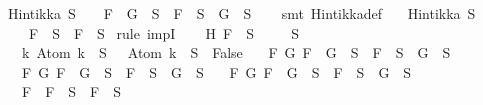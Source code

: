 \begin{isabellebody}
\ {\isachardoublequoteopen}Hintikka\ S\ {\isasymLongrightarrow}\ \ \ {\isacharparenleft}F\ \isactrlbold {\isasymrightarrow}\ G\ {\isasymin}\ S\ {\isasymlongrightarrow}\ \isactrlbold {\isasymnot}F\ {\isasymin}\ S\ {\isasymor}\ G\ {\isasymin}\ S{\isacharparenright}{\isachardoublequoteclose}\isanewline
%
\isadelimproof
\ \ %
\endisadelimproof
%
\isatagproof
{}\isamarkupfalse%
\ {\isacharparenleft}smt\ Hintikka{\isacharunderscore}def{\isacharparenright}%
\endisatagproof
{\isafoldproof}%
%
\isadelimproof
\isanewline
%
\endisadelimproof
\isanewline
{}\isamarkupfalse%
\isanewline
\ \ \ {\isachardoublequoteopen}Hintikka\ S{\isachardoublequoteclose}\isanewline
\ \ \ {\isachardoublequoteopen}{\isacharparenleft}\isactrlbold {\isasymnot}\ {\isacharparenleft}\isactrlbold {\isasymnot}F{\isacharparenright}\ {\isasymin}\ S\ {\isasymlongrightarrow}\ F\ {\isasymin}\ S{\isacharparenright}{\isachardoublequoteclose}\isanewline
%
\isadelimproof
%
\endisadelimproof
%
\isatagproof
{}\isamarkupfalse%
\ {\isacharparenleft}rule\ impI{\isacharparenright}\isanewline
\ \ \isamarkupfalse%
\ H{\isacharcolon}{\isachardoublequoteopen}\isactrlbold {\isasymnot}\ {\isacharparenleft}\isactrlbold {\isasymnot}F{\isacharparenright}\ {\isasymin}\ S{\isachardoublequoteclose}\isanewline
\ \isamarkupfalse%
\ {\isachardoublequoteopen}{\isasymbottom}\ {\isasymnotin}\ S\isanewline
\ \ {\isasymand}\ {\isacharparenleft}{\isasymforall}k{\isachardot}\ Atom\ k\ {\isasymin}\ S\ {\isasymlongrightarrow}\ \isactrlbold {\isasymnot}\ {\isacharparenleft}Atom\ k{\isacharparenright}\ {\isasymin}\ S\ {\isasymlongrightarrow}\ False{\isacharparenright}\isanewline
\ \ {\isasymand}\ {\isacharparenleft}{\isasymforall}F\ G{\isachardot}\ F\ \isactrlbold {\isasymand}\ G\ {\isasymin}\ S\ {\isasymlongrightarrow}\ F\ {\isasymin}\ S\ {\isasymand}\ G\ {\isasymin}\ S{\isacharparenright}\isanewline
\ \ {\isasymand}\ {\isacharparenleft}{\isasymforall}F\ G{\isachardot}\ F\ \isactrlbold {\isasymor}\ G\ {\isasymin}\ S\ {\isasymlongrightarrow}\ F\ {\isasymin}\ S\ {\isasymor}\ G\ {\isasymin}\ S{\isacharparenright}\isanewline
\ \ {\isasymand}\ {\isacharparenleft}{\isasymforall}F\ G{\isachardot}\ F\ \isactrlbold {\isasymrightarrow}\ G\ {\isasymin}\ S\ {\isasymlongrightarrow}\ \isactrlbold {\isasymnot}F\ {\isasymin}\ S\ {\isasymor}\ G\ {\isasymin}\ S{\isacharparenright}\isanewline
\ \ {\isasymand}\ {\isacharparenleft}{\isasymforall}F{\isachardot}\ \isactrlbold {\isasymnot}\ {\isacharparenleft}\isactrlbold {\isasymnot}F{\isacharparenright}\ {\isasymin}\ S\ {\isasymlongrightarrow}\ F\ {\isasymin}\ S{\isacharparenright}\isanewline

\end{isabellebody}
